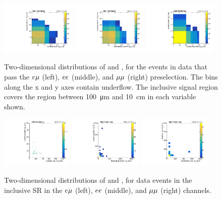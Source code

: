 \begin{figure}
\centering
\includegraphics[width=0.32\textwidth]{figures/results/d0vsd0_emu_CMSPreliminary.pdf}
\includegraphics[width=0.32\textwidth]{figures/results/d0vsd0_ee_CMSPreliminary.pdf}
\includegraphics[width=0.32\textwidth]{figures/results/d0vsd0_mumu_CMSPreliminary.pdf}
\caption{
Two-dimensional distributions of \ada and \adb, for the events in data that pass the $e{\mu}$ (left), $ee$ (middle), and ${\mu}{\mu}$ (right) preselection. The bins along the x and y axes contain underflow. The inclusive signal region covers the region between \SI{100}{\um} and \SI{10}{\cm} in each \ad variable shown.
}
\label{d0_d0_data}
\end{figure}

\begin{figure}
\centering
\includegraphics[width=0.31\textwidth]{figures/results/electronAbsD0[0]_vs_muonAbsD0[0]_1000um.pdf}
\includegraphics[width=0.31\textwidth]{figures/results/electronAbsD0[0]_vs_electronAbsD0[1]_10000um.pdf}
\includegraphics[width=0.31\textwidth]{figures/results/muonAbsD0[0]_vs_muonAbsD0[1]_10000um.pdf}
\caption{
Two-dimensional distributions of \ada and \adb, for data events in the inclusive SR in the $e{\mu}$ (left), $ee$ (middle), and ${\mu}{\mu}$ (right) channels.
}
\label{d0_d0_sr_data}
\end{figure}